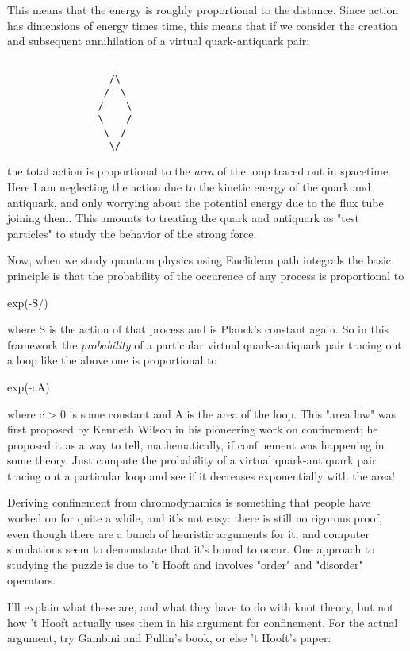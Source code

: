 This means that the energy is roughly proportional to the distance.
Since action has dimensions of energy times time, this means that if
we consider the creation and subsequent annihilation of
a virtual quark-antiquark pair: 


\begin{verbatim}

                  /\
                 /  \
                /    \
                \    /
                 \  /
                  \/

\end{verbatim}
    
the total action is proportional to the \emph{area} of the loop traced out
in spacetime.  Here I am neglecting the action due to the kinetic
energy of the quark and antiquark, and only worrying about the
potential energy due to the flux tube joining them.  This amounts to
treating the quark and antiquark as "test particles" to study the
behavior of the strong force.

Now, when we study quantum physics using Euclidean path integrals the
basic principle is that the probability of the occurence of any
process is proportional to

exp(-S/\hbar ) 

where S is the action of that process and \hbar  is Planck's constant
again.  So in this framework the \emph{probability} of a particular virtual 
quark-antiquark pair tracing out a loop like the above one is proportional
to 

exp(-cA)

where c > 0 is some constant and A is the area of the loop.  This
"area law" was first proposed by Kenneth Wilson in his pioneering work
on confinement; he proposed it as a way to tell, mathematically, if
confinement was happening in some theory.  Just compute the
probability of a virtual quark-antiquark pair tracing out a particular
loop and see if it decreases exponentially with the area!

Deriving confinement from chromodynamics is something that people have
worked on for quite a while, and it's not easy: there is still no
rigorous proof, even though there are a bunch of heuristic arguments
for it, and computer simulations seem to demonstrate that it's bound
to occur.  One approach to studying the puzzle is due to 't Hooft and
involves "order" and "disorder" operators.  

I'll explain what these are, and what they have to do with knot
theory, but not how 't Hooft actually uses them in his argument for
confinement.  For the actual argument, try Gambini and Pullin's book,
or else 't Hooft's paper:

